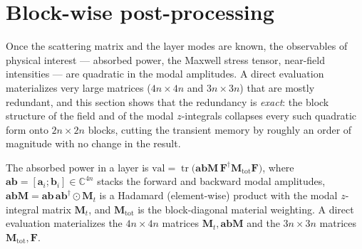 \documentclass[11pt]{article}
\theoremstyle{remark}
\newcommand{\CC}{\mathbb{C}}
\DeclareMathOperator{\tr}{tr}
\begin{document}
\section{Block-wise post-processing}
\label{sec:post}

Once the scattering matrix and the layer modes are known, the observables of
physical interest --- absorbed power, the Maxwell stress tensor, near-field
intensities --- are quadratic in the modal amplitudes.  A direct evaluation
materializes very large matrices ($4n\times4n$ and $3n\times3n$) that are
mostly redundant, and this section shows that the redundancy is \emph{exact}:
the block structure of the field and of the modal $z$-integrals collapses every
such quadratic form onto $2n\times2n$ blocks, cutting the transient memory by
roughly an order of magnitude with no change in the result.

The absorbed power in a layer is
$\mathrm{val}=\tr\big(\mathbf{abM}\,\mathbf{F}^\dagger
\mathbf{M}_{\mathrm{tot}}\mathbf{F}\big)$, where
$\mathbf{ab}=[\mathbf{a}_i;\mathbf{b}_i]\in\CC^{4n}$ stacks the forward and
backward modal amplitudes, $\mathbf{abM}=\mathbf{ab}\,\mathbf{ab}^\dagger\odot
\mathbf{M}_t$ is a Hadamard (element-wise) product with the modal $z$-integral
matrix $\mathbf{M}_t$, and $\mathbf{M}_{\mathrm{tot}}$ is the block-diagonal
material weighting. A direct evaluation materializes the $4n\times4n$ matrices
$\mathbf{M}_t,\mathbf{abM}$ and the $3n\times3n$ matrices
$\mathbf{M}_{\mathrm{tot}},\mathbf{F}$.
\end{document}
